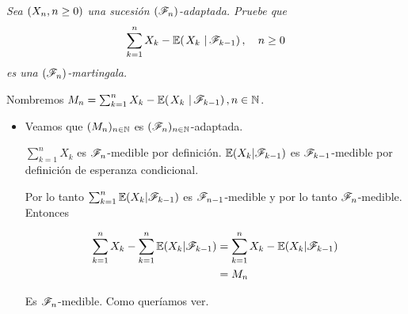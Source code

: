 \emph{
    Sea $\left( X_n,n\geq 0\right) $ una sucesi\'on $\left( \mathscr{F}_n\right) $-adaptada. Pruebe que
    \begin{align}
        \sum_{k=1}^n X_k-\espc{X_k}{\F_{k-1}}, \quad n\geq 0
    \end{align}
    es una $\left( \mathscr{F}_n\right) $-martingala.
}

\afterstatement\par\null

Nombremos $M_n = \sum_{k=1}^n X_k-\espc{X_k}{\F_{k-1}}, n \in \N$.

\begin{itemize}
	\item 
        Veamos que $(M_n)_{n \in \mathbb{N}}$ es $(\mathscr{F}_n)_{n \in \mathbb{N}}$-adaptada.\par\null
    
        $\sum_{k = 1}^n X_k$ es $\mathscr{F}_n$-medible por definición. $\mathbb{E}(X_k | \mathscr{F}_{k-1})$ es $\mathscr{F}_{k-1}$-medible por definición
        de esperanza condicional. \par\null
        
        Por lo tanto $\sum_{k = 1}^n \mathbb{E}(X_k | \mathscr{F}_{k-1})$ es $\mathscr{F}_{n-1}$-medible y por lo tanto
        $\mathscr{F}_n$-medible. Entonces
        
        \begin{align}
            \sum_{k = 1}^n X_k - \sum_{k = 1}^n \mathbb{E}(X_k | \mathscr{F}_{k-1}) &=  \sum_{k = 1}^n X_k - \mathbb{E}(X_k | \mathscr{F}_{k-1})    \\
                                                                    &=  M_n   
        \end{align}
    
        Es $\mathscr{F}_n$-medible. Como queríamos ver.
\end{itemize}